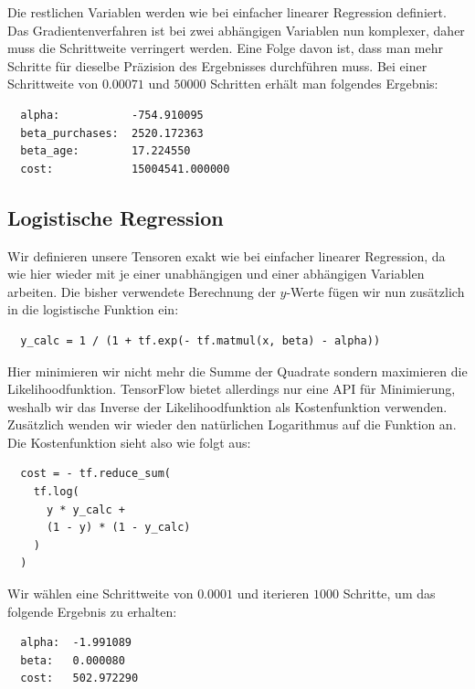 Die restlichen Variablen werden wie bei einfacher linearer Regression definiert. Das Gradientenverfahren ist bei zwei abhängigen Variablen nun komplexer, daher muss die Schrittweite verringert werden. Eine Folge davon ist, dass man mehr Schritte für dieselbe Präzision des Ergebnisses durchführen muss. Bei einer Schrittweite von $0.00071$ und $50000$ Schritten erhält man folgendes Ergebnis:

\begin{verbatim}
  alpha:           -754.910095
  beta_purchases:  2520.172363
  beta_age:        17.224550
  cost:            15004541.000000
\end{verbatim}

\subsection{Logistische Regression}
\label{subsection:3:3:4}

Wir definieren unsere Tensoren exakt wie bei einfacher linearer Regression, da wie hier wieder mit je einer unabhängigen und einer abhängigen Variablen arbeiten. Die bisher verwendete Berechnung der $y$-Werte fügen wir nun zusätzlich in die logistische Funktion ein:

\begin{verbatim}
  y_calc = 1 / (1 + tf.exp(- tf.matmul(x, beta) - alpha))
\end{verbatim}

Hier minimieren wir nicht mehr die Summe der Quadrate sondern maximieren die Likelihoodfunktion. TensorFlow bietet allerdings nur eine API für Minimierung, weshalb wir das Inverse der Likelihoodfunktion als Kostenfunktion verwenden. Zusätzlich wenden wir wieder den natürlichen Logarithmus auf die Funktion an. Die Kostenfunktion sieht also wie folgt aus:

\begin{verbatim}
  cost = - tf.reduce_sum(
    tf.log(
      y * y_calc +
      (1 - y) * (1 - y_calc)
    )
  )
\end{verbatim}

Wir wählen eine Schrittweite von $0.0001$ und iterieren $1000$ Schritte, um das folgende Ergebnis zu erhalten:

\begin{verbatim}
  alpha:  -1.991089
  beta:   0.000080
  cost:   502.972290
\end{verbatim}

